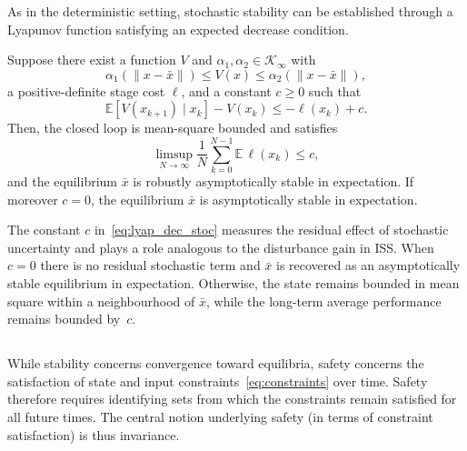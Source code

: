 
As in the deterministic setting, stochastic stability can be established through a Lyapunov function satisfying an expected decrease condition.

\begin{thm}\label{thm:stochstab}
	Suppose there exist a function $V$ and
	$\alpha_1, \alpha_2 \in \mathcal{K}_\infty$ with
	\[
		\alpha_1(\|x - \bar x\|)
		\le
		V(x)
		\le
		\alpha_2(\|x - \bar x\|),
	\]
	a positive-definite stage cost $\ell$, and a constant
	$c \ge 0$ such that
	\begin{equation}
    \label{eq:lyap_dec_stoc}
		\mathbb{E}\!\left[V(x_{k+1}) \mid x_k\right] - V(x_k)
		\le
		-\ell(x_k) + c .
	\end{equation}
	Then, the closed loop is mean-square bounded and satisfies
	\begin{equation*}
		\limsup_{N \to \infty}
		\frac{1}{N}
		\sum_{k=0}^{N-1}
		\mathbb{E}\,\ell(x_k)
		\le c ,
	\end{equation*}
	and the equilibrium $\bar x$ is robustly asymptotically stable in expectation.
	If moreover $c = 0$, the equilibrium $\bar x$ is asymptotically stable in expectation.
\end{thm}

The constant $c$ in~\eqref{eq:lyap_dec_stoc} measures the residual effect of stochastic uncertainty and plays a role analogous to the disturbance gain in ISS. When $c = 0$ there is no residual stochastic term and $\bar{x}$ is recovered as an asymptotically stable equilibrium in expectation. Otherwise, the state remains bounded in mean square within a neighbourhood of $\bar x$, while the long-term average performance remains bounded by~$c$.

\subsection{\texorpdfstring{}{Invariance and Safety Filters}}
While stability concerns convergence toward equilibria, safety concerns the satisfaction of state and input constraints~\eqref{eq:constraints} over time.
 Safety therefore requires identifying sets from which the constraints remain satisfied for all future times. The central notion underlying safety (in terms of constraint satisfaction) is thus invariance.

